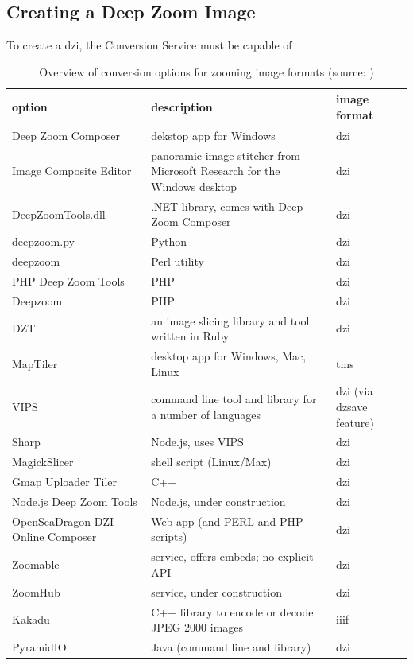 \subsection{Creating a Deep Zoom Image}

To create a dzi, the Conversion Service must be capable of 

\begin{table}
	\begin{center}
		\begin{tabular}{| p{3cm} | p{4cm} | p{2cm} |}
			\hline
			\textbf{option} & \textbf{description} & \textbf{image format} \\
			\hline
      		Deep Zoom Composer & dekstop app for Windows & dzi \\ \hline
      		Image Composite Editor & panoramic image stitcher from Microsoft Research for the Windows desktop & dzi \\ \hline
      		DeepZoomTools.dll & .NET-library, comes with Deep Zoom Composer & dzi \\ \hline
      		deepzoom.py & Python & dzi \\ \hline
      		deepzoom & Perl utility & dzi \\ \hline
      		PHP Deep Zoom Tools & PHP & dzi \\ \hline
      		Deepzoom & PHP & dzi \\ \hline
     		 DZT & an image slicing library and tool written in Ruby & dzi \\ \hline
     		MapTiler &  desktop app for Windows, Mac, Linux & tms \\ \hline
      		VIPS & command line tool and library for a number of languages & dzi (via dzsave feature) \\ \hline
     		Sharp & Node.js, uses VIPS & dzi \\ \hline
      		MagickSlicer & shell script (Linux/Max) & dzi \\ \hline
      		Gmap Uploader Tiler & C++ & dzi \\ \hline
      		Node.js Deep Zoom Tools & Node.js, under construction & dzi \\ \hline
      		OpenSeaDragon DZI Online Composer & Web app (and PERL and PHP scripts) & dzi \\ \hline
      		Zoomable & service, offers embeds; no explicit API & dzi \\ \hline
      		ZoomHub & service, under construction & dzi \\ \hline
      		Kakadu & C++ library to encode or decode JPEG 2000 images & iiif \\ \hline
      		PyramidIO & Java (command line and library) & dzi \\ \hline
  		\end{tabular}
  	\caption{Overview of conversion options for zooming image formats (source: \cite{web:openseadragon})}
  	\end{center}
\end{table}
  
